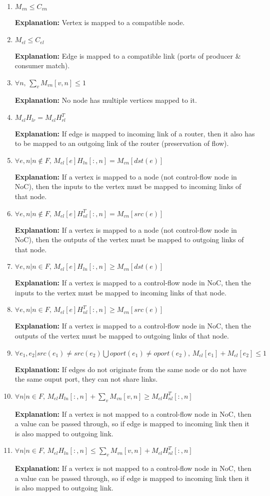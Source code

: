 \begin{enumerate}
\item $M_{vn} \le C_{vn}$

\textbf{Explanation:} Vertex is mapped to a compatible node.
\item $M_{el} \le C_{el}$

\textbf{Explanation:} Edge is mapped to a compatible link (ports of producer \& consumer match).
\item $\forall n, \, \sum\limits_v M_{vn}[v,n] \le 1$

\textbf{Explanation:} No node has multiple vertices mapped to it.
\item $M_{el} H_{lr} = M_{el} H_{rl}^T$

\textbf{Explanation:} If edge is mapped to incoming link of a router, then it also has to be mapped to an outgoing link of the router (preservation of flow).
\item $\forall e, n |n \notin F, \, M_{el}[e]H_{ln}[:,n] = M_{vn}[dst(e)]$ 

\textbf{Explanation:} If a vertex is mapped to a node (not control-flow node in NoC), then the inputs to the vertex must be mapped to incoming links of that node.
\item $\forall e,n|n \notin F, \, M_{el}[e]H_{nl}^T[:,n] = M_{vn}[src(e)]$

\textbf{Explanation:} If a vertex is mapped to a node (not control-flow node in NoC), then the outputs of the vertex must be mapped to outgoing links of that node.
\item $\forall e, n |n \in F, \, M_{el}[e]H_{ln}[:,n] \ge M_{vn}[dst(e)]$ 

\textbf{Explanation:} If a vertex is mapped to a control-flow node in NoC, then the inputs to the vertex must be mapped to incoming links of that node.
\item $\forall e,n|n \in F, \, M_{el}[e]H_{nl}^T[:,n] \ge M_{vn}[src(e)]$

\textbf{Explanation:} If a vertex is mapped to a control-flow node in NoC, then the outputs of the vertex must be mapped to outgoing links of that node.
\item $\forall e_1, e_2 | src(e_1) \ne src(e_2)  \bigcup oport(e_1) \ne oport(e_2), \, M_{el}[e_1] + M_{el}[e_2] \le 1$

\textbf{Explanation:} If edges do not originate from the same node or do not have the same ouput port, they can not share links.
\item $\forall n |n \in F, \, M_{el}H_{ln}[:,n] + \sum\limits_v M_{vn}[v,n] \ge M_{el}H_{nl}^T[:,n]$ 

\textbf{Explanation:} If a vertex is not mapped to a control-flow node in NoC, then a value can be passed through, so if edge is mapped to incoming link then it is also mapped to outgoing link.
\item $\forall n |n \in F, \, M_{el}H_{ln}[:,n] \le \sum\limits_v M_{vn}[v,n] + M_{el}H_{nl}^T[:,n]$ 

\textbf{Explanation:} If a vertex is not mapped to a control-flow node in NoC, then a value can be passed through, so if edge is mapped to incoming link then it is also mapped to outgoing link.
\end{enumerate}
